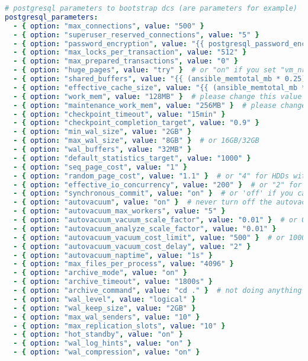 \begin{flushleft}
\begin{lstlisting}[language=yaml, caption=Testsystem - Anhang - Maintenance - main.yml,captionpos=b,label={lst:testsystem-maintenance-main.yml},breaklines=true]
# postgresql parameters to bootstrap dcs (are parameters for example)
postgresql_parameters:
  - { option: "max_connections", value: "500" }
  - { option: "superuser_reserved_connections", value: "5" }
  - { option: "password_encryption", value: "{{ postgresql_password_encryption_algorithm }}" }
  - { option: "max_locks_per_transaction", value: "512" }
  - { option: "max_prepared_transactions", value: "0" }
  - { option: "huge_pages", value: "try" }  # or "on" if you set "vm_nr_hugepages" in kernel parameters
  - { option: "shared_buffers", value: "{{ (ansible_memtotal_mb * 0.25) | int }}MB" }  # by default, 25% of RAM
  - { option: "effective_cache_size", value: "{{ (ansible_memtotal_mb * 0.75) | int }}MB" }  # by default, 75% of RAM
  - { option: "work_mem", value: "128MB" }  # please change this value
  - { option: "maintenance_work_mem", value: "256MB" }  # please change this value
  - { option: "checkpoint_timeout", value: "15min" }
  - { option: "checkpoint_completion_target", value: "0.9" }
  - { option: "min_wal_size", value: "2GB" }
  - { option: "max_wal_size", value: "8GB" }  # or 16GB/32GB
  - { option: "wal_buffers", value: "32MB" }
  - { option: "default_statistics_target", value: "1000" }
  - { option: "seq_page_cost", value: "1" }
  - { option: "random_page_cost", value: "1.1" }  # or "4" for HDDs with slower random access
  - { option: "effective_io_concurrency", value: "200" }  # or "2" for traditional HDDs with lower I/O parallelism
  - { option: "synchronous_commit", value: "on" }  # or 'off' if you can you lose single transactions in case of a crash
  - { option: "autovacuum", value: "on" }  # never turn off the autovacuum!
  - { option: "autovacuum_max_workers", value: "5" }
  - { option: "autovacuum_vacuum_scale_factor", value: "0.01" }  # or 0.005/0.001
  - { option: "autovacuum_analyze_scale_factor", value: "0.01" }
  - { option: "autovacuum_vacuum_cost_limit", value: "500" }  # or 1000/5000
  - { option: "autovacuum_vacuum_cost_delay", value: "2" }
  - { option: "autovacuum_naptime", value: "1s" }
  - { option: "max_files_per_process", value: "4096" }
  - { option: "archive_mode", value: "on" }
  - { option: "archive_timeout", value: "1800s" }
  - { option: "archive_command", value: "cd ." }  # not doing anything yet with WAL-s
  - { option: "wal_level", value: "logical" }
  - { option: "wal_keep_size", value: "2GB" }
  - { option: "max_wal_senders", value: "10" }
  - { option: "max_replication_slots", value: "10" }
  - { option: "hot_standby", value: "on" }
  - { option: "wal_log_hints", value: "on" }
  - { option: "wal_compression", value: "on" }

\end{lstlisting}
\end{flushleft}
